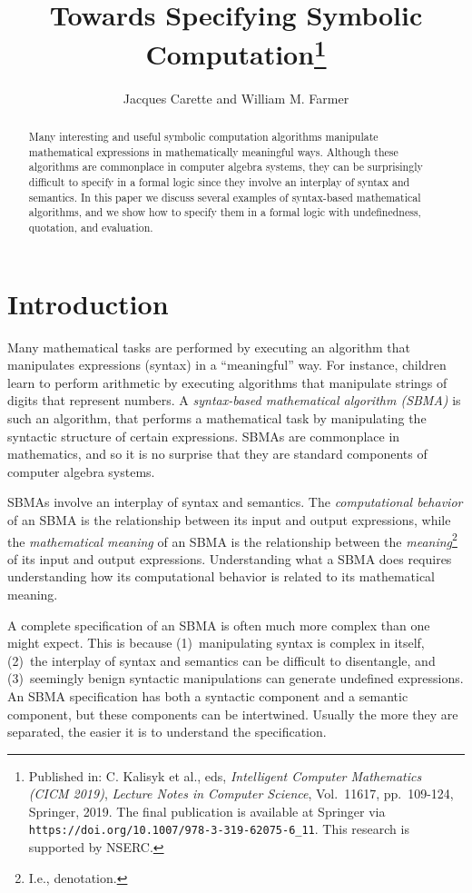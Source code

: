 \documentclass[fleqn]{llncs}
\title{Towards Specifying Symbolic Computation\thanks{Published in:
    C. Kalisyk et al., eds, \emph{Intelligent Computer Mathematics
      (CICM 2019)}, \emph{Lecture Notes in Computer Science},
    Vol.~11617, pp.~109-124, Springer, 2019. The final publication is
    available at Springer via
    \texttt{https://doi.org/10.1007/978-3-319-62075-6\_11}.  This
    research is supported by NSERC.}}
\author{Jacques Carette and William M. Farmer}
\institute{%
Computing and Software, McMaster University, Canada\\
\url{http://www.cas.mcmaster.ca/~carette}\\
\url{http://imps.mcmaster.ca/wmfarmer}\\[2ex]
6 May 2019
}
\begin{document}
\maketitle

\begin{abstract}
\bsp
Many interesting and useful symbolic computation algorithms manipulate
mathematical expressions in mathematically meaningful ways.  Although
these algorithms are commonplace in computer algebra systems, they can
be surprisingly difficult to specify in a formal logic since they
involve an interplay of syntax and semantics.  In this paper we
discuss several examples of syntax-based mathematical algorithms, and
we show how to specify them in a formal logic with undefinedness,
quotation, and evaluation.
\esp
\end{abstract}

\iffalse

\textbf{Keywords:} Symbolic computation, computer algebra systems,
reasoning about syntax, undefinedness, quotation and evaluation.

\fi

\section{Introduction}

Many mathematical tasks are performed by executing an algorithm that
manipulates expressions (syntax) in a ``meaningful'' way.  For instance,
children learn to perform arithmetic by executing algorithms that manipulate
strings of digits that represent numbers.  A \emph{syntax-based
mathematical algorithm (SBMA)} is such an algorithm, that performs a
mathematical task by manipulating the syntactic structure of certain
expressions.  SBMAs are commonplace in mathematics, and so it is no surprise
that they are standard components of computer algebra systems.

SBMAs involve an interplay of syntax and semantics.  The
\emph{computational behavior} of an SBMA is the relationship between
its input and output expressions, while the \emph{mathematical meaning} of an
SBMA is the relationship between the \emph{meaning}\footnote{I.e., denotation.}
of its input and output expressions.  Understanding what a SBMA does requires
understanding how its computational behavior is related to its mathematical
meaning.

A complete specification of an SBMA is often much more complex than
one might expect.  This is because (1)~manipulating syntax is complex
in itself, (2)~the interplay of syntax and semantics can be difficult
to disentangle, and (3)~seemingly benign syntactic
manipulations can generate undefined expressions.  An SBMA
specification has both a syntactic component and a semantic component,
but these components can be intertwined.  Usually the more they are
separated, the easier it is to understand the specification.
\end{document}
